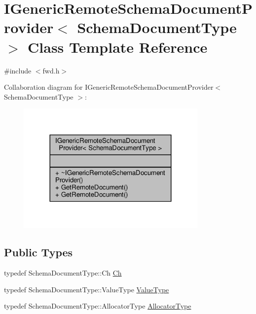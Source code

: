 \hypertarget{classIGenericRemoteSchemaDocumentProvider}{}\section{I\+Generic\+Remote\+Schema\+Document\+Provider$<$ Schema\+Document\+Type $>$ Class Template Reference}
\label{classIGenericRemoteSchemaDocumentProvider}


{\ttfamily \#include $<$fwd.\+h$>$}



Collaboration diagram for I\+Generic\+Remote\+Schema\+Document\+Provider$<$ Schema\+Document\+Type $>$\+:
\nopagebreak
\begin{figure}[H]
\begin{center}
\leavevmode
\includegraphics[width=264pt]{classIGenericRemoteSchemaDocumentProvider__coll__graph}
\end{center}
\end{figure}
\subsection*{Public Types}
\begin{DoxyCompactItemize}
\item 
typedef Schema\+Document\+Type\+::\+Ch \hyperlink{classIGenericRemoteSchemaDocumentProvider_acfcd5492c3df8ff56cd2d84d36cc0ceb}{Ch}
\item 
typedef Schema\+Document\+Type\+::\+Value\+Type \hyperlink{classIGenericRemoteSchemaDocumentProvider_aefaefd0d3fc938b6a81634edf1646205}{Value\+Type}
\item 
typedef Schema\+Document\+Type\+::\+Allocator\+Type \hyperlink{classIGenericRemoteSchemaDocumentProvider_a79476f0e0f4d51ca7244685698dadbd0}{Allocator\+Type}
\end{DoxyCompactItemize}

